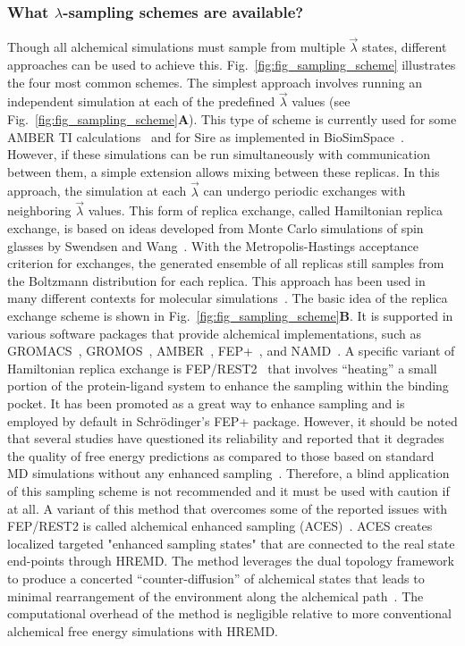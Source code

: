 \documentclass[9pt,bestpractices]{livecoms}
\begin{document}
\subsubsection{What $\lambda$-sampling schemes are available?}
\label{sec:sampling_schemes}
Though all alchemical simulations must sample from multiple $\vec{\lambda}$ states, different approaches can be used to achieve this. Fig.~\ref{fig:fig_sampling_scheme} illustrates the four most common schemes. The simplest approach involves running an independent simulation at each of the predefined $\vec{\lambda}$ values (see Fig.~\ref{fig:fig_sampling_scheme}\textbf{A}). This type of scheme is currently used for some AMBER TI calculations~\cite{song2019using} and for Sire as implemented in BioSimSpace~\cite{hedges2019biosimspace}. However, if these simulations can be run simultaneously with communication between them, a simple extension allows mixing between these replicas. In this approach, the simulation at each $\vec{\lambda}$ can undergo periodic exchanges with neighboring $\vec{\lambda}$ values. This form of replica exchange, called Hamiltonian replica exchange, is based on ideas developed from Monte Carlo simulations of spin glasses by Swendsen and Wang~\cite{swendsen1986replica}. With the Metropolis-Hastings acceptance criterion for exchanges, the generated ensemble of all replicas still samples from the Boltzmann distribution for each replica. This approach has been used in many different contexts for molecular simulations~\cite{sugita2000multidimensional,sugita1999replicaexchange, woods2003development, jiang2010free}. The basic idea of the replica exchange scheme is shown in Fig.~\ref{fig:fig_sampling_scheme}\textbf{B}. It is supported in various software packages that provide alchemical implementations, such as GROMACS~\cite{aldeghi2015accurate}, GROMOS~\cite{hritz2008hamiltonian,hritz2007optimization},
AMBER~\cite{Lee_JChemInfModel_2020_v60_p5595}, FEP+~\cite{wang2015accurate}, and NAMD~\cite{jiang2019computing}.
A specific variant of Hamiltonian replica exchange is FEP/REST2~\cite{rest2, feprest} that involves ``heating'' a small portion of the protein-ligand system to enhance the sampling within the binding pocket. It has been promoted as a great way to enhance sampling and is employed by default in Schr\"{o}dinger's FEP+ package. However, it should be noted that several studies have questioned its reliability and reported that it degrades the quality of free energy predictions as compared to those based on standard MD simulations without any enhanced sampling~\cite{wan2020fep+, bhati2022}. Therefore, a blind application of this sampling scheme is not recommended and it must be used with caution if at all. A variant of this method that overcomes some of the reported issues with FEP/REST2 is called alchemical enhanced sampling (ACES)~\cite{lee2023aces}. ACES creates localized targeted "enhanced sampling states" that are connected to the real state end-points through HREMD.  The method leverages the dual topology framework to produce a concerted “counter-diffusion” of alchemical states that leads to minimal rearrangement of the environment along the alchemical path~\cite{York_ACSPhysChemAu_2023_v3_p478}. The computational overhead of the method is negligible relative to more conventional alchemical free energy simulations with HREMD.
\end{document}
